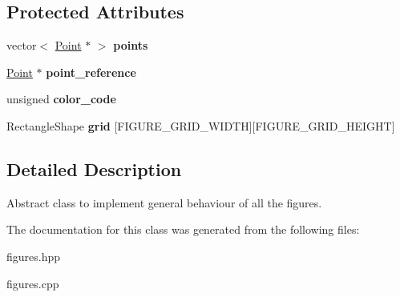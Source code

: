 \subsection*{Protected Attributes}
\begin{DoxyCompactItemize}
\item 
\mbox{\label{classFigure_a75edaa86d6e3763da7bd5a75b6a2480c}} 
vector$<$ \hyperlink{classPoint}{Point} $\ast$ $>$ {\bfseries points}
\item 
\mbox{\label{classFigure_acd5536a72eab8325e3082a8814a986f2}} 
\hyperlink{classPoint}{Point} $\ast$ {\bfseries point\+\_\+reference}
\item 
\mbox{\label{classFigure_acb7cf05a2b796e1e4324fa2bebd94409}} 
unsigned {\bfseries color\+\_\+code}
\item 
\mbox{\label{classFigure_abed96d3e2685342c544250befb10be4f}} 
Rectangle\+Shape {\bfseries grid} \mbox{[}F\+I\+G\+U\+R\+E\+\_\+\+G\+R\+I\+D\+\_\+\+W\+I\+D\+TH\mbox{]}\mbox{[}F\+I\+G\+U\+R\+E\+\_\+\+G\+R\+I\+D\+\_\+\+H\+E\+I\+G\+HT\mbox{]}
\end{DoxyCompactItemize}


\subsection{Detailed Description}
Abstract class to implement general behaviour of all the figures. 

The documentation for this class was generated from the following files\+:\begin{DoxyCompactItemize}
\item 
figures.\+hpp\item 
figures.\+cpp\end{DoxyCompactItemize}
